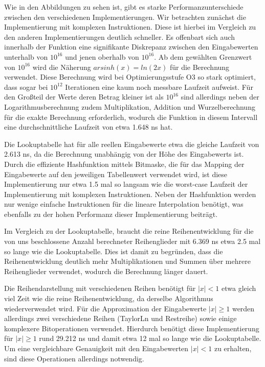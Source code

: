 \documentclass[course=erap] {aspdoc}
\begin{document}
     Wie in den Abbildungen zu sehen ist, gibt es starke Performanzunterschiede zwischen den verschiedenen Implementierungen. Wir betrachten zunächst die Implementierung mit komplexen Instruktionen. Diese ist hierbei im Vergleich zu den anderen Implementierungen deutlich schneller. Es offenbart sich auch innerhalb der Funktion eine signifikante Diskrepanz zwischen den Eingabewerten unterhalb von $10^{16}$ und jenen oberhalb von $10^{16}$.
     Ab dem gewählten Grenzwert von $10^{16}$ wird die Näherung $arsinh(x) = ln(2x)$ für die Berechnung verwendet. Diese Berechnung wird bei Optimierungsstufe O3 so stark optimiert, dass sogar bei $10^{12}$ Iterationen eine kaum noch messbare Laufzeit aufweist. Für den Großteil der Werte deren Betrag kleiner ist als $10^{16}$ sind allerdings neben der Logarithmusberechnung zudem Multiplikation, Addition und Wurzelberechnung für die exakte Berechnung erforderlich, wodurch die Funktion in diesem Intervall eine durchschnittliche Laufzeit von etwa 1.648 ns hat.

     Die Lookuptabelle hat für alle reellen Eingabewerte etwa die gleiche Laufzeit von 2.613 ns, da die Berechnung unabhängig von der Höhe des Eingabewerts ist. Durch die effiziente Hashfunktion mittels Bitmaske, die für das Mapping der Eingabewerte auf den jeweiligen Tabellenwert verwendet wird, ist diese Implementierung nur etwa 1.5 mal so langsam wie die worst-case Laufzeit der Implementierung mit komplexen Instruktionen. Neben der Hashfunktion werden nur wenige einfache Instruktionen für die lineare Interpolation benötigt, was ebenfalls zu der hohen Performanz dieser Implementierung beiträgt.

     Im Vergleich zu der Lookuptabelle, braucht die reine Reihenentwicklung für die von uns beschlossene Anzahl berechneter Reihenglieder mit 6.369 ns etwa 2.5 mal so lange wie die Lookuptabelle. Dies ist damit zu begründen, dass die Reihenentwicklung deutlich mehr Multiplikationen und Summen über mehrere Reihenglieder verwendet, wodurch die Berechnung länger dauert.

     Die Reihendarstellung mit verschiedenen Reihen benötigt für $|x|<1$ etwa gleich viel Zeit wie die reine Reihenentwicklung, da derselbe Algorithmus wiederverwendet wird. Für die Approximation der Eingabewerte $|x|\geq1$ werden allerdings zwei verschiedene Reihen (TaylorLn und Restreihe) sowie einige komplexere Bitoperationen verwendet. Hierdurch benötigt diese Implementierung für $|x|\geq1$ rund 29.212 ns und damit etwa 12 mal so lange wie die Lookuptabelle. Um eine vergleichbare Genauigkeit mit den Eingabewerten $|x|<1$ zu erhalten, sind diese Operationen allerdings notwendig.
\end{document}
